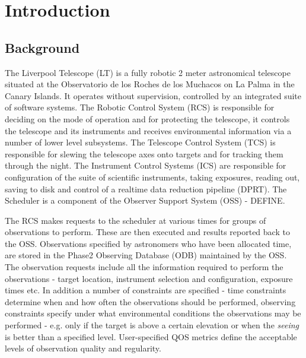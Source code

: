 \section{Introduction}

\subsection{Background}
The Liverpool Telescope (LT) is a fully robotic 2 meter astronomical telescope situated at the Observatorio de los Roches de los Muchacos on La Palma in the Canary Islands. It operates without supervision, controlled by an integrated suite of software systems. The Robotic Control System (RCS) is responsible for deciding on the mode of operation and for protecting the telescope, it controls the telescope and its instruments and receives environmental information via a number of lower level subsystems. The Telescope Control System (TCS) is responsible for slewing the telescope axes onto targets and for tracking them through the night. The Instrument Control Systems (ICS) are responsible for configuration of the suite of scientific instruments, taking exposures, reading out, saving to disk and control of a realtime data reduction pipeline (DPRT). The Scheduler is a component of the Observer Support System (OSS) - DEFINE. 

The RCS makes requests to the scheduler at various times for groups of observations to perform. These are then executed and results reported back to the OSS. Observations specified by astronomers who have been allocated time, are stored in the Phase2 Observing Database (ODB) maintained by the OSS. The observation requests include all the information required to perform the observations - target location, instrument selection and configuration, exposure times etc. In addition a number of constraints are specified - time constraints determine when and how often the observations should be performed, observing constraints specify under what environmental conditions the observations may be performed - e.g. only if the target is above a certain elevation or when the \emph{seeing} is better than a specified level. User-specified QOS metrics define the acceptable levels of observation quality and regularity. 

